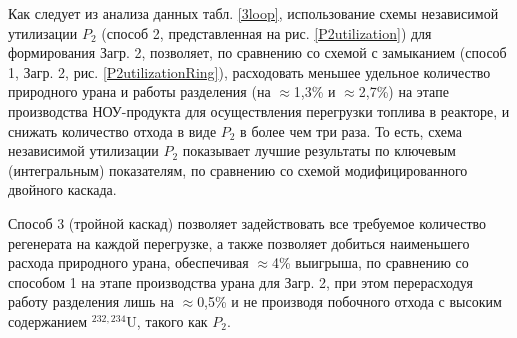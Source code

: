 Как следует из анализа данных табл. \ref{3loop}, использование схемы независимой утилизации $P_2$ (способ 2, представленная на рис. \ref{P2utilization}) для формирования Загр. 2, позволяет, по сравнению со схемой с замыканием (способ 1, Загр. 2, рис. \ref{P2utilizationRing}), расходовать меньшее удельное количество природного урана и работы разделения (на $\approx$1,3\% и $\approx$2,7\%) на этапе производства НОУ-продукта для осуществления перегрузки топлива в реакторе, и снижать количество отхода в виде $P_2$ в более чем три раза. То есть, схема независимой утилизации $P_2$ показывает лучшие результаты по ключевым (интегральным) показателям, по сравнению со схемой модифицированного двойного каскада.

Способ 3 (тройной каскад) позволяет задействовать все требуемое количество регенерата на каждой перегрузке, а также позволяет добиться наименьшего расхода природного урана, обеспечивая $\approx$4\% выигрыша, по сравнению со способом 1 на этапе производства урана для Загр. 2, при этом перерасходуя работу разделения лишь на $\approx$0,5\% и не производя побочного отхода с высоким содержанием $^{232,234}$U, такого как $P_2$.




\clearpage

